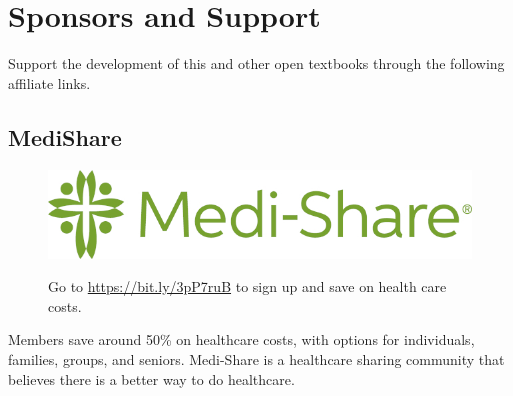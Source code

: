 \chapter*{Sponsors and Support}

Support the development of this and other open textbooks through the following affiliate links.

%

\section*{MediShare}
\begin{figure}[!ht]
    \centering
    \href{https://bit.ly/3pP7ruB}{\includegraphics[width=\textwidth]{img/support/medishare/Medi-ShareLogo.jpg}}
    \caption{Go to \href{https://bit.ly/3pP7ruB}{https://bit.ly/3pP7ruB} to sign up and save on health care costs.}
\end{figure}
\noindent Members save around 50\% on healthcare costs, with options for individuals, families, groups, and seniors. Medi-Share is a healthcare sharing community that believes there is a better way to do healthcare.

